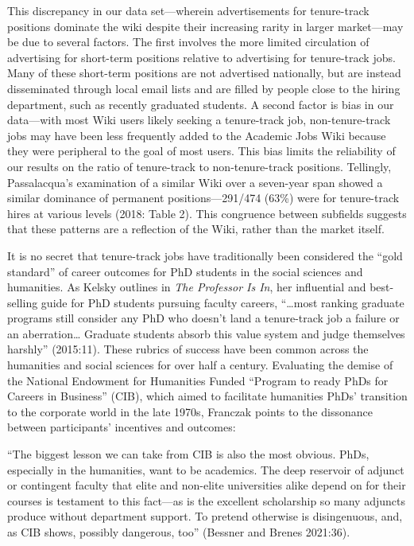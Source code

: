 \documentclass[
  12pt,
]{article}
\begin{document}
This discrepancy in our data set---wherein advertisements for
tenure-track positions dominate the wiki despite their increasing rarity
in larger market---may be due to several factors. The first involves the
more limited circulation of advertising for short-term positions
relative to advertising for tenure-track jobs. Many of these short-term
positions are not advertised nationally, but are instead disseminated
through local email lists and are filled by people close to the hiring
department, such as recently graduated students. A second factor is bias
in our data---with most Wiki users likely seeking a tenure-track job,
non-tenure-track jobs may have been less frequently added to the
Academic Jobs Wiki because they were peripheral to the goal of most
users. This bias limits the reliability of our results on the ratio of
tenure-track to non-tenure-track positions. Tellingly, Passalacqua's
examination of a similar Wiki over a seven-year span showed a similar
dominance of permanent positions---291/474 (63\%) were for tenure-track
hires at various levels (2018: Table 2). This congruence between
subfields suggests that these patterns are a reflection of the Wiki,
rather than the market itself.

It is no secret that tenure-track jobs have traditionally been
considered the ``gold standard'' of career outcomes for PhD students in
the social sciences and humanities. As Kelsky outlines in \emph{The
Professor Is In}, her influential and best-selling guide for PhD
students pursuing faculty careers, ``\ldots most ranking graduate
programs still consider any PhD who doesn't land a tenure-track job a
failure or an aberration\ldots{} Graduate students absorb this value
system and judge themselves harshly'' (2015:11). These rubrics of
success have been common across the humanities and social sciences for
over half a century. Evaluating the demise of the National Endowment for
Humanities Funded ``Program to ready PhDs for Careers in Business''
(CIB), which aimed to facilitate humanities PhDs' transition to the
corporate world in the late 1970s, Franczak points to the dissonance
between participants' incentives and outcomes:

``The biggest lesson we can take from CIB is also the most obvious.
PhDs, especially in the humanities, want to be academics. The deep
reservoir of adjunct or contingent faculty that elite and non-elite
universities alike depend on for their courses is testament to this
fact---as is the excellent scholarship so many adjuncts produce without
department support. To pretend otherwise is disingenuous, and, as CIB
shows, possibly dangerous, too'' (Bessner and Brenes 2021:36).
\end{document}
